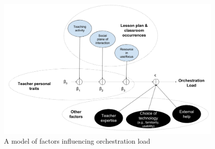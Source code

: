 \documentclass[10pt,journal,compsoc]{IEEEtran}
\begin{document}
\begin{figure}[!t]
\centering
\includegraphics[width=\linewidth]{img/ModelFactorsOL}
\caption{A model of factors influencing orchestration load}
\label{fig:model}
\end{figure}
\end{document}
